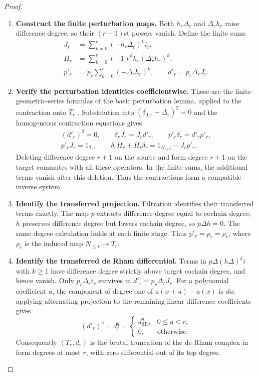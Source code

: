 \documentclass[11pt,a4paper]{article}
\numberwithin{algorithm}{section}
\numberwithin{equation}{section}
\theoremstyle{definition}
\theoremstyle{remark}
\theoremstyle{plain}
\theoremstyle{definition}
\theoremstyle{plain}
\begin{document}
\begin{proof}
\begin{enumerate}[leftmargin=*,align=left]
\item \textbf{Construct the finite perturbation maps.}
Both $h_r\Delta_r$ and $\Delta_rh_r$ raise difference
degree, so their $(r+1)$st powers vanish. Define the finite sums
\[
 \begin{aligned}
 J_r&=\sum_{k=0}^r(-h_r\Delta_r)^k i_r,\\
 H_r&=\sum_{k=0}^r(-1)^k h_r(\Delta_rh_r)^k,\\
 p'_r&=p_r\sum_{k=0}^r(-\Delta_rh_r)^k,
 \qquad d'_r=p_r\Delta_rJ_r.
 \end{aligned}
\]

\item \textbf{Verify the perturbation identities coefficientwise.}
These are the finite-geometric-series formulas of the basic
perturbation lemma, applied to the contraction onto $T_r$
\citep{MillerRahmati}.  Substitution into
$(\delta_{0,r}+\Delta_r)^2=0$ and the homogeneous
contraction equations gives
\[
 \begin{gathered}
 (d'_r)^2=0,\qquad \delta_rJ_r=J_rd'_r,\qquad
 p'_r\delta_r=d'_rp'_r,\\
 p'_rJ_r=1_{T_r},\qquad
 \delta_rH_r+H_r\delta_r=1_{N_{\le r}}-J_rp'_r.
 \end{gathered}
\]
Deleting difference degree $r+1$ on the source and form degree
$r+1$ on the target commutes with all these operators. In the
finite sums, the additional terms vanish after this deletion.
Thus the contractions form a compatible inverse system.

\item \textbf{Identify the transferred projection.}
Filtration identifies their transferred terms exactly.
The map $p$ extracts difference degree equal to cochain degree;
$h$ preserves difference degree but lowers cochain degree, so
$p\Delta h=0$. The same degree calculation holds at each
finite stage. Thus $p'_r=p_r=\rho_r$, where $\rho_r$ is
the induced map $N_{\le r}\to T_r$.

\item \textbf{Identify the transferred de Rham differential.}
Terms in
$p\Delta(h\Delta)^ki$ with $k\ge1$ have difference degree
strictly above target cochain degree, and hence vanish.  Only
$p_r\Delta_ri_r$ survives in $d'_r=p_r\Delta_rJ_r$.
For a polynomial coefficient $a$, the component of degree one
of $a(x+u)-a(x)$ is $da$; applying alternating projection to
the remaining linear difference coefficients gives
\[
 (d'_r)^q=d_r^q=
 \begin{cases}
 d_{\mathrm{dR}}^q,&0\le q<r,\\
 0,&\text{otherwise}.
 \end{cases}
\]
Consequently $(T_r,d_r)$ is the brutal truncation of the de Rham
complex in form degrees at most $r$, with zero differential
out of its top degree.


\end{enumerate}
\end{proof}
\end{document}
